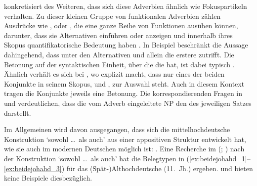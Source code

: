 \citet[425--428]{johannessen2005} konkretisiert des Weiteren, dass sich diese
Adverbien ähnlich wie Fokuspartikeln verhalten. Zu
dieser kleinen Gruppe von funktionalen Adverbien zählen Ausdrücke
wie ,  oder , die eine ganze Reihe von Funktionen
ausüben können, darunter, dass sie Alternativen einführen oder anzeigen und
innerhalb ihres Skopus quantifikatorische Bedeutung haben \autocite[vgl.][1--4,
15]{koenig1991}. In Beispiel  beschränkt  die
Aussage dahingehend, dass unter den Alternativen  und 
allein die erstere zutrifft. Die Betonung auf der syntaktischen Einheit, über
die die   hat, ist dabei typisch
\autocite[10--14]{koenig1991}. Ähnlich verhält es sich bei ,
wo  explizit macht, dass nur eines der beiden Konjunkte in seinem
Skopus,  und , zur Auswahl steht. Auch in diesem Kontext
tragen die Konjunkte jeweils eine Betonung. Die korrespondierenden Fragen in
 und  verdeutlichen, dass die vom
Adverb eingeleitete NP den  des
jeweiligen Satzes darstellt.

\begin{exe}
\end{exe}

Im Allgemeinen wird davon ausgegangen, dass sich die
mittelhochdeutsche Konstruktion 
`sowohl \dots\ als auch' aus einer appositiven Struktur
entwickelt hat, wie sie auch im modernen Deutschen möglich
ist:  \autocite[vgl.][626--627 und die
dortigen Referenzen]{ksw2}. Eine Recherche im  (;
\nosh\cite{ddd}) nach der Konstruktion  `sowohl \dots\
als auch' \autocite[vgl.][49]{schuetzeichel2012} hat die Belegtypen in
(\ref{ex:beidejohahd_1}--\ref{ex:beidejohahd_3}) für das
(Spät-)Althochdeutsche (11.~Jh.) ergeben. \citet{braune2018}
und \citet{schrodt2004} bieten keine Beispiele dies\-bezüglich.

